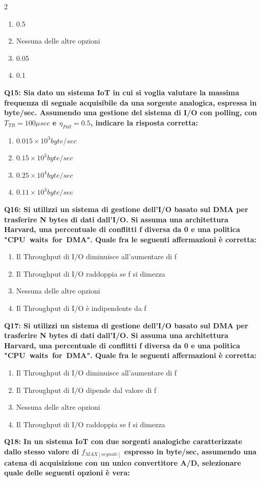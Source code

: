 \documentclass[10pt]{article}
\begin{document}
\begin{multicols}{2}
\begin{enumerate}[label=\arabic*.]
\item 0.5
\item Nessuna delle altre opzioni
\item 0.05
\item 0.1
\end{enumerate}
\textbf{Q15: Sia dato un sistema IoT in cui si voglia valutare la massima frequenza di segnale acquisibile da una sorgente analogica, espressa in byte/sec. Assumendo una gestione del sistema di I/O con polling, con $T_{TR}=100\mu sec$ e $\eta_{Poll}=0.5$, indicare la risposta corretta:}

\begin{enumerate}[label=\arabic*.]
\item $0.015\times10^3 byte/sec$
\item $0.15\times10^3 byte/sec$
\item $0.25\times10^4 byte/sec$
\item $0.11\times10^3 byte/sec$
\end{enumerate}
\textbf{Q16: Si utilizzi un sistema di gestione dell’I/O basato sul DMA per trasferire N bytes di dati dall’I/O. Si assuma una architettura Harvard, una percentuale di conflitti f diversa da 0 e una politica "CPU waits for DMA". Quale fra le seguenti affermazioni è corretta:}

\begin{enumerate}[label=\arabic*.]
\item Il Throughput di I/O diminuisce all’aumentare di f
\item Il Throughput di I/O raddoppia se f si dimezza
\item Nessuna delle altre opzioni
\item Il Throughput di I/O è indipendente da f
\end{enumerate}
\textbf{Q17: Si utilizzi un sistema di gestione dell’I/O basato sul DMA per trasferire N bytes di dati dall’I/O. Si assuma una architettura Harvard, una percentuale di conflitti f diversa da 0 e una politica "CPU waits for DMA". Quale fra le seguenti affermazioni è corretta:}

\begin{enumerate}[label=\arabic*.]
\item Il Throughput di I/O diminuisce all’aumentare di f
\item Il Throughput di I/O dipende dal valore di f
\item Nessuna delle altre opzioni
\item Il Throughput di I/O raddoppia se f si dimezza
\end{enumerate}
\textbf{Q18: In un sistema IoT con due sorgenti analogiche caratterizzate dallo stesso valore di $f_{MAX[segnale]}$ espresso in byte/sec, assumendo una catena di acquisizione con un unico convertitore A/D, selezionare quale delle seguenti opzioni è vera:}


\end{multicols}
\end{document}
